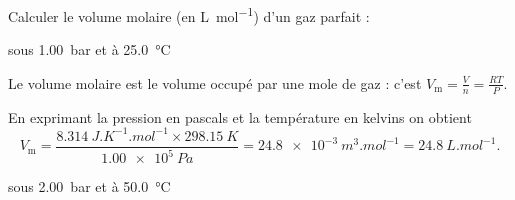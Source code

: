 \finEntrainement





\hauteurLargeurCadreReponse		{7mm}{30mm}
\initialisationEntrainement

Calculer le volume molaire (en \si{L.mol^{-1}}) d'un gaz parfait :

\debutEntrainement



\begin{enonce}
sous \SI{1.00}{bar} et à \SI{25,0}{\celsius}
\end{enonce}


\begin{corrige}
Le volume molaire est le volume occupé par une mole de gaz : c'est $V_\text{m}=\frac{V}{n}=\frac{RT}{P}$. 

En exprimant la pression en pascals et la température en kelvins on obtient 
\[
V_\text{m}=\frac{\SI{8,314}{J.K^{-1}.mol^{-1}}\times \SI{298.15}{K}}{\SI{1.00e5}{Pa}}=\SI{24.8e-3}{m^3.mol^{-1}}=\SI{24.8}{L.mol^{-1}}.
\]
\end{corrige}



\begin{enonce}
sous \SI{2.00}{bar} et à \SI{50,0}{\celsius}
\end{enonce}

